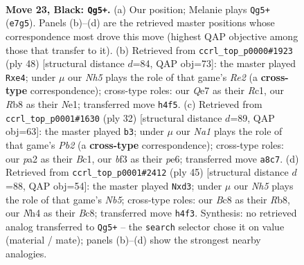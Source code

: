 \documentclass[11pt]{article}
\begin{document}
\clearpage

\begin{figure}[p]\centering
\begin{subfigure}{0.46\textwidth}\centering
\resizebox{\linewidth}{!}{%
\newchessgame
\chessboard[
  setfen={nrbr2k1/p3qpb1/7p/2p1p2P/1p5n/3PPB2/PPQ2P2/RNB1NRK1 b - - 3 23},
  showmover=false,
  pgfstyle=straightmove, color=movearrow, markmove={e7-g5}
]}
\caption{}
\end{subfigure}\hfill
\begin{subfigure}{0.46\textwidth}\centering
\resizebox{\linewidth}{!}{%
\newchessgame
\chessboard[
  setfen={3rrn1k/2q3pp/1p1bpp2/p7/P1PPb3/1Q5P/1B2RPP1/2R1N1K1 w - - 0 25},
  showmover=false,
  pgfstyle=straightmove, color=movearrow, markmove={e2-e4}
]}
\caption{}
\end{subfigure}
\\[4pt]
\begin{subfigure}{0.46\textwidth}\centering
\resizebox{\linewidth}{!}{%
\newchessgame
\chessboard[
  setfen={r1r3k1/1bq1bppp/pp1ppn2/8/P1PNP3/6P1/1P2QPBP/R1BR2K1 w - - 1 17},
  showmover=false,
  pgfstyle=straightmove, color=movearrow, markmove={b2-b3}
]}
\caption{}
\end{subfigure}\hfill
\begin{subfigure}{0.46\textwidth}\centering
\resizebox{\linewidth}{!}{%
\newchessgame
\chessboard[
  setfen={1rb2rk1/p1b1qpp1/P3p2p/8/1n1P4/3B1N2/1P2QPPP/R1BR2K1 b - - 4 23},
  showmover=false,
  pgfstyle=straightmove, color=movearrow, markmove={b4-d3}
]}
\caption{}
\end{subfigure}
\caption{\textbf{Move 23, Black: \texttt{Qg5+}.} (a) Our position; Melanie plays \texttt{Qg5+} (\texttt{e7g5}). Panels (b)--(d) are the retrieved master positions whose correspondence most drove this move (highest QAP objective among those that transfer to it). (b) Retrieved from \texttt{ccrl\_top\_p0000\#1923} (ply 48) [structural distance $d$=84, QAP obj=73]: the master played \texttt{Rxe4}; under $\mu$ our \emph{Nh5} plays the role of that game's \emph{Re2} (a \textbf{cross-type} correspondence); cross-type roles: our \emph{Q}e7 as their \emph{R}c1, our \emph{R}b8 as their \emph{N}e1; transferred move \texttt{h4f5}. (c) Retrieved from \texttt{ccrl\_top\_p0001\#1630} (ply 32) [structural distance $d$=89, QAP obj=63]: the master played \texttt{b3}; under $\mu$ our \emph{Na1} plays the role of that game's \emph{Pb2} (a \textbf{cross-type} correspondence); cross-type roles: our \emph{p}a2 as their \emph{B}c1, our \emph{b}f3 as their \emph{p}e6; transferred move \texttt{a8c7}. (d) Retrieved from \texttt{ccrl\_top\_p0001\#2412} (ply 45) [structural distance $d$=88, QAP obj=54]: the master played \texttt{Nxd3}; under $\mu$ our \emph{Nh5} plays the role of that game's \emph{Nb5}; cross-type roles: our \emph{B}c8 as their \emph{R}b8, our \emph{N}h4 as their \emph{B}c8; transferred move \texttt{h4f3}. Synthesis: no retrieved analog transferred to \texttt{Qg5+} -- the \texttt{search} selector chose it on value (material / mate); panels (b)--(d) show the strongest nearby analogies.}
\label{fig:thought-m45}
\end{figure}
\end{document}
